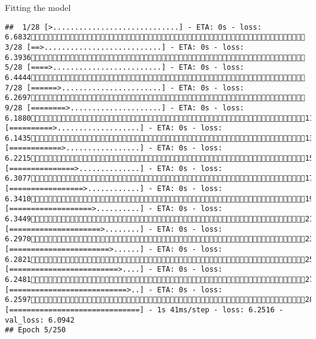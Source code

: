 \documentclass[
  ignorenonframetext,
]{beamer}
\begin{document}
\begin{frame}[fragile]{Fitting the model}
\begin{verbatim}
##  1/28 [>.............................] - ETA: 0s - loss: 6.6832 3/28 [==>...........................] - ETA: 0s - loss: 6.3936 5/28 [====>.........................] - ETA: 0s - loss: 6.4444 7/28 [======>.......................] - ETA: 0s - loss: 6.2697 9/28 [========>.....................] - ETA: 0s - loss: 6.188011/28 [==========>...................] - ETA: 0s - loss: 6.143513/28 [============>.................] - ETA: 0s - loss: 6.221515/28 [===============>..............] - ETA: 0s - loss: 6.307717/28 [=================>............] - ETA: 0s - loss: 6.341019/28 [===================>..........] - ETA: 0s - loss: 6.344921/28 [=====================>........] - ETA: 0s - loss: 6.297023/28 [=======================>......] - ETA: 0s - loss: 6.282125/28 [=========================>....] - ETA: 0s - loss: 6.248127/28 [===========================>..] - ETA: 0s - loss: 6.259728/28 [==============================] - 1s 41ms/step - loss: 6.2516 - val_loss: 6.0942
## Epoch 5/250

\end{verbatim}
\end{frame}
\end{document}
